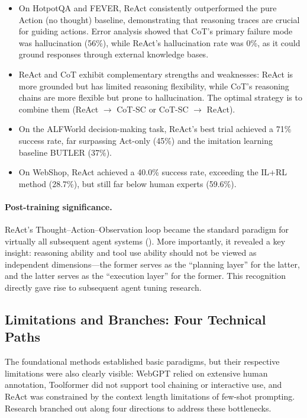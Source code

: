 \begin{itemize}[leftmargin=*]
  \item On HotpotQA and FEVER, ReAct consistently outperformed the pure Action (no thought) baseline, demonstrating that reasoning traces are crucial for guiding actions. Error analysis showed that CoT's primary failure mode was hallucination (56\%), while ReAct's hallucination rate was 0\%, as it could ground responses through external knowledge bases.
  \item ReAct and CoT exhibit complementary strengths and weaknesses: ReAct is more grounded but has limited reasoning flexibility, while CoT's reasoning chains are more flexible but prone to hallucination. The optimal strategy is to combine them (ReAct $\rightarrow$ CoT-SC or CoT-SC $\rightarrow$ ReAct).
  \item On the ALFWorld decision-making task, ReAct's best trial achieved a 71\% success rate, far surpassing Act-only (45\%) and the imitation learning baseline BUTLER (37\%).
  \item On WebShop, ReAct achieved a 40.0\% success rate, exceeding the IL+RL method (28.7\%), but still far below human experts (59.6\%).
\end{itemize}

\paragraph{Post-training significance.} ReAct's Thought--Action--Observation loop became the standard paradigm for virtually all subsequent agent systems (). More importantly, it revealed a key insight: reasoning ability and tool use ability should not be viewed as independent dimensions---the former serves as the ``planning layer'' for the latter, and the latter serves as the ``execution layer'' for the former. This recognition directly gave rise to subsequent agent tuning research.


\subsection{Limitations and Branches: Four Technical Paths}
\label{sec:t6-branches}

The foundational methods established basic paradigms, but their respective limitations were also clearly visible: WebGPT relied on extensive human annotation, Toolformer did not support tool chaining or interactive use, and ReAct was constrained by the context length limitations of few-shot prompting. Research branched out along four directions to address these bottlenecks.

